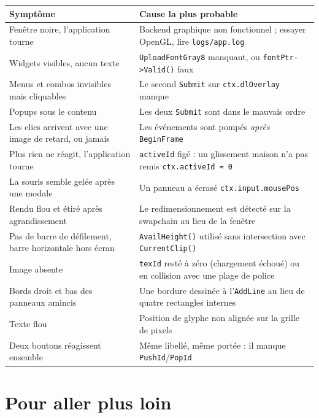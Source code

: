 \begin{center}
\begin{tabular}{@{}p{}p{}@{}}
\toprule
\textbf{Symptôme} & \textbf{Cause la plus probable} \\
\midrule
Fenêtre noire, l'application tourne & Backend graphique non fonctionnel ; essayer OpenGL, lire \texttt{logs/app.log} \\
Widgets visibles, aucun texte & \texttt{UploadFontGray8} manquant, ou \texttt{fontPtr->Valid()} faux \\
Menus et combos invisibles mais cliquables & Le second \texttt{Submit} sur \texttt{ctx.dlOverlay} manque \\
Popups sous le contenu & Les deux \texttt{Submit} sont dans le mauvais ordre \\
Les clics arrivent avec une image de retard, ou jamais & Les événements sont pompés \emph{après} \texttt{BeginFrame} \\
Plus rien ne réagit, l'application tourne & \texttt{activeId} figé : un glissement maison n'a pas remis \texttt{ctx.activeId = 0} \\
La souris semble gelée après une modale & Un panneau a écrasé \texttt{ctx.input.mousePos} \\
Rendu flou et étiré après agrandissement & Le redimensionnement est détecté sur la swapchain au lieu de la fenêtre \\
Pas de barre de défilement, barre horizontale hors écran & \texttt{AvailHeight()} utilisé sans intersection avec \texttt{CurrentClip()} \\
Image absente & \texttt{texId} resté à zéro (chargement échoué) ou en collision avec une plage de police \\
Bords droit et bas des panneaux amincis & Une bordure dessinée à l'\texttt{AddLine} au lieu de quatre rectangles internes \\
Texte flou & Position de glyphe non alignée sur la grille de pixels \\
Deux boutons réagissent ensemble & Même libellé, même portée : il manque \texttt{PushId}/\texttt{PopId} \\
\bottomrule
\end{tabular}
\end{center}

\section{Pour aller plus loin}


